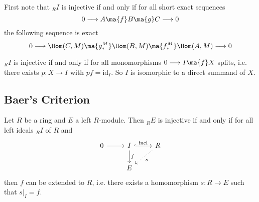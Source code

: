 First note that $_R I$ is injective if and only if for all short exact sequences
\[
0 \longrightarrow A \ma{f} B \ma{g} C \longrightarrow 0
\]
the following sequence is exact
\[
0 \longrightarrow \Hom(C,M) \ma{g_*^M} \Hom(B,M) \ma{f_*^M} \Hom(A,M) \longrightarrow 0
\]

\begin{prop}
$_R I$ is injective if and only if for all monomorphisms $0 \longrightarrow I \ma{f} X$ splits, i.e. there exists $p: X \rightarrow I$ with $pf=\text{id}_I$. So $I$ is isomorphic to a direct summand of $X$.
\end{prop}



\subsection{Baer's Criterion} 


\begin{thm}
Let $R$ be a ring and $E$ a left $R$-module. Then $_R E$ is injective if and only if for all left ideals $_R I$ of $R$ and 
\[
\begin{tikzcd}
0 \arrow{r} & I \arrow[hook]{r}{\text{incl}} \arrow{d}{f} & R \arrow[dotted]{dl}{s} \\
& E & 
\end{tikzcd}
\]
then $f$ can be extended to $R$, i.e. there exists a homomorphism $s: R \rightarrow E$ such that $s|_I=f$. 
\end{thm}

